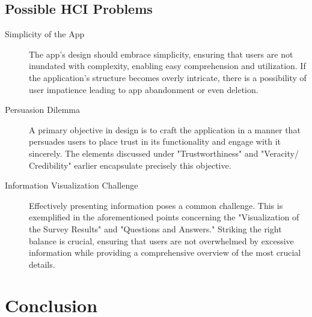 \documentclass[11pt]{report}
\begin{document}
\subsection{Possible HCI Problems}

\begin{description}
    
    \item[Simplicity of the App] The app's design should embrace simplicity, ensuring that users are not inundated with complexity, enabling easy comprehension and utilization. If the application's structure becomes overly intricate, there is a possibility of user impatience leading to app abandonment or even deletion.

    \item[Persuasion Dilemma] A primary objective in design is to craft the application in a manner that persuades users to place trust in its functionality and engage with it sincerely. The elements discussed under "Trustworthiness" and "Veracity/ Credibility" earlier encapsulate precisely this objective.

    \item[Information Visualization Challenge] Effectively presenting information poses a common challenge. This is exemplified in the aforementioned points concerning the "Visualization of the Survey Results" and "Questions and Answers." Striking the right balance is crucial, ensuring that users are not overwhelmed by excessive information while providing a comprehensive overview of the most crucial details.
    
\end{description}

\section{Conclusion}
\end{document}
